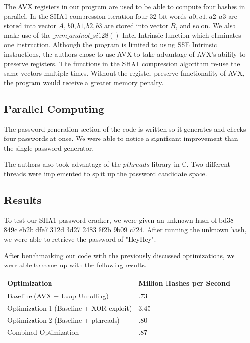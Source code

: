 \documentclass[letterpaper, 10 pt, conference]{ieeeconf}  %
\begin{document}
The AVX registers in our program are used to be able to compute four hashes in parallel.  In the SHA1 compression iteration four 32-bit words $a0, a1, a2, a3$ are stored into vector $A$, $b0, b1, b2, b3$ are stored into vector $B$, and so on.  We also make use of the $\_mm\_andnot\_si128()$ Intel Intrinsic function which eliminates one instruction.  Although the program is limited to using SSE Intrinsic instructions, the authors chose to use AVX to take advantage of AVX's ability to preserve registers.  The functions in the SHA1 compression algorithm re-use the same vectors multiple times.  Without the register preserve functionality of AVX, the program would receive a greater memory penalty.  

\subsection{Parallel Computing}

The password generation section of the code is written so it generates and checks four passwords at once.  We were able to notice a significant improvement than the single password generator.

The authors also took advantage of the $pthreads$ library in C.  Two different threads were implemented to split up the password candidate space. 

\subsection{Results}

To test our SHA1 password-cracker, we were given an unknown hash of bd38 849c eb2b dfe7 312d 3d27 2483 8f2b 9b09 c724.  After running the unknown hash, we were able to retrieve the password of "HeyHey".

After benchmarking our code with the previously discussed optimizations, we were able to come up with the following results:

\begin{center}
    \begin{tabular}{| p{4cm} | l |}
        \hline
         Optimization & Million Hashes per Second \\ \hline
        Baseline (AVX + Loop Unrolling) & .73 \\ \hline
        Optimization 1 (Baseline + XOR exploit) & 3.45 \\ \hline
        Optimization 2 (Baseline + pthreads) & .80 \\ \hline
        Combined Optimization & .87 \\
        \hline
    \end{tabular}
\end{center}
\end{document}
